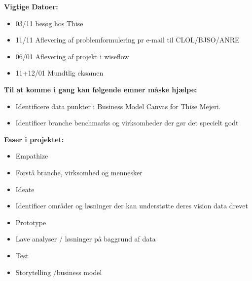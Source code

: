 \documentclass[
  12pt,
  a4paper,
  DIV=11,
  numbers=noendperiod]{scrartcl}
\providecommand{\tightlist}{%
  \setlength{\itemsep}{0pt}\setlength{\parskip}{0pt}}\usepackage{longtable,booktabs,array}
\begin{document}
\begin{itemize}
  \textbf{Vigtige Datoer:}~

  \begin{itemize}
  \item
    03/11 besøg hos Thise~
  \item
    11/11 Aflevering af problemformulering pr e-mail til CLOL/BJSO/ANRE~
  \item
    06/01 Aflevering af projekt i wiseflow~
  \item
    11+12/01 Mundtlig eksamen~
  \end{itemize}

  \textbf{Til at komme i gang kan følgende emner måske hjælpe:}~

  \begin{itemize}
  \item
    Identificere data punkter i Business Model Canvas for Thise Mejeri.~
  \item
    Identificer branche benchmarks og virksomheder der gør det specielt
    godt~
  \end{itemize}

  \textbf{Faser i projektet:}~

  \begin{itemize}
  \tightlist
  \item
    Empathize~
  \end{itemize}

  \begin{itemize}
  \tightlist
  \item
    Forstå branche, virksomhed og mennesker~
  \end{itemize}

  \begin{itemize}
  \tightlist
  \item
    Ideate~
  \end{itemize}

  \begin{itemize}
  \tightlist
  \item
    Identificer områder og løsninger der kan understøtte deres vision
    data drevet~
  \end{itemize}

  \begin{itemize}
  \tightlist
  \item
    Prototype~
  \end{itemize}

  \begin{itemize}
  \tightlist
  \item
    Lave analyser / løsninger på baggrund af data~
  \end{itemize}

  \begin{itemize}
  \item
    Test~
  \item
    Storytelling /business model~
  \end{itemize}
\end{itemize}
\end{document}
